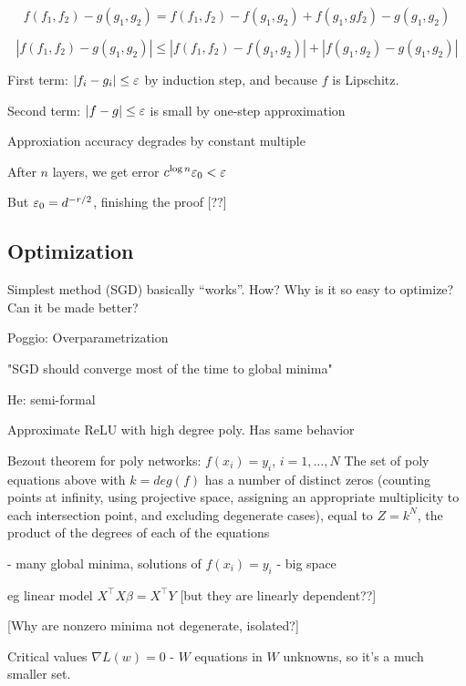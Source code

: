 \documentclass[english]{article}
\begin{document}
$$f(f_1,f_2)-g(g_1,g_2) = f(f_1,f_2)-f(g_1,g_2)+f(g_1,gf_2)-g(g_1,g_2)$$

$$|f(f_1,f_2)-g(g_1,g_2)| \le| f(f_1,f_2)-f(g_1,g_2)|+|f(g_1,g_2)-g(g_1,g_2)|$$


First term: $|f_i-g_i| \le \varepsilon$ by induction step, and because $f$ is Lipschitz.

Second term: $|f-g| \le \varepsilon$ is small by one-step approximation

Approxiation accuracy degrades by constant multiple 

After $n$ layers, we get error $c^{\log n } \varepsilon_0 <\varepsilon$

But $\varepsilon_0 = d^{-r/2}$, finishing the proof [??]



\eenum

\subsection{Optimization}


\benum
\item 
Simplest method (SGD) basically ``works''. How? Why is it so easy to optimize? Can it be made better? 

\item Poggio: Overparametrization

\benum

\item "SGD should converge most of the time to global minima"

He: semi-formal

\item Approximate ReLU with high degree poly. Has same behavior

\item Bezout theorem for poly networks:  $f(x_i)=y_i$, $i=1,\ldots,N$  The set of poly equations above with $k=deg(f)$ has a number of distinct zeros (counting points at infinity, using projective space, assigning an appropriate multiplicity to each intersection point, and excluding degenerate cases), equal to $Z=k^N$, the product of the degrees of each of the equations

- many global minima, solutions of $f(x_i)=y_i$ - big space


eg linear model $X^\top X \beta = X^\top Y$ [but they are linearly dependent??]

[Why are nonzero minima not degenerate, isolated?]


\item Critical values $\nabla L(w)=0$ - $W$ equations in $W$ unknowns, so it's a much smaller set.
\end{document}
